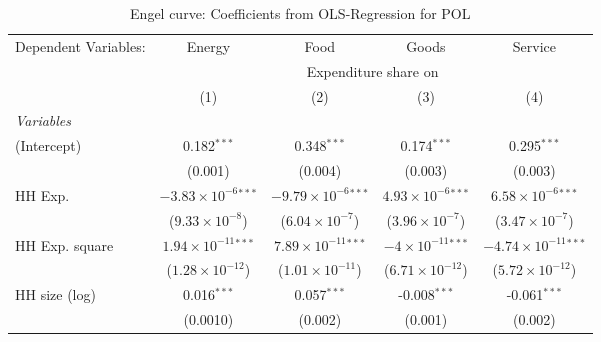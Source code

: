 
\begin{table}[htbp!]
   \centering
   \small
   \begin{adjustbox}{width = 1\textwidth, max height = 0.95\textheight, center}
      \begin{threeparttable}[b]
         \caption{\label{tab:Engel_parametric_POL} Engel curve: Coefficients from OLS-Regression for POL}
         \begin{tabular}{lcccc}
            \tabularnewline \midrule \midrule
            Dependent Variables: & Energy                         & Food                           & Goods                         & Service\\  
             & \multicolumn{4}{c}{Expenditure share on} \\ 
                                 & (1)                            & (2)                            & (3)                           & (4)\\  
            \midrule
            \emph{Variables}\\
            (Intercept)          & 0.182$^{***}$                  & 0.348$^{***}$                  & 0.174$^{***}$                 & 0.295$^{***}$\\   
                                 & (0.001)                        & (0.004)                        & (0.003)                       & (0.003)\\   
            HH Exp.              & $-3.83\times 10^{-6}$$^{***}$  & $-9.79\times 10^{-6}$$^{***}$  & $4.93\times 10^{-6}$$^{***}$  & $6.58\times 10^{-6}$$^{***}$\\    
                                 & ($9.33\times 10^{-8}$)         & ($6.04\times 10^{-7}$)         & ($3.96\times 10^{-7}$)        & ($3.47\times 10^{-7}$)\\    
            HH Exp. square       & $1.94\times 10^{-11}$$^{***}$  & $7.89\times 10^{-11}$$^{***}$  & $-4\times 10^{-11}$$^{***}$   & $-4.74\times 10^{-11}$$^{***}$\\    
                                 & ($1.28\times 10^{-12}$)        & ($1.01\times 10^{-11}$)        & ($6.71\times 10^{-12}$)       & ($5.72\times 10^{-12}$)\\    
            HH size (log)        & 0.016$^{***}$                  & 0.057$^{***}$                  & -0.008$^{***}$                & -0.061$^{***}$\\   
                                 & (0.0010)                       & (0.002)                        & (0.001)                       & (0.002)\\   

\end{tabular}
\end{threeparttable}
\end{adjustbox}
\end{table}
